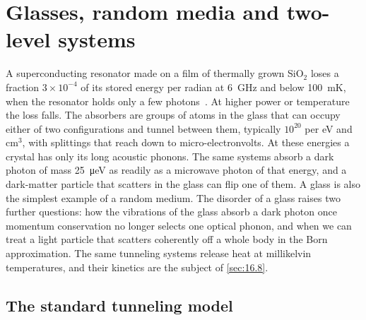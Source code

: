 \section{Glasses, random media and two-level systems}\label{sec:16.7}

A superconducting resonator made on a film of thermally grown SiO$_2$ loses a fraction $3\times10^{-4}$ of its stored energy per radian at \SI{6}{GHz} and below \SI{100}{mK}, when the resonator holds only a few photons~\cite[Table~I]{oconnell2008microwave}. At higher power or temperature the loss falls. The absorbers are groups of atoms in the glass that can occupy either of two configurations and tunnel between them, typically $10^{20}$ per eV and cm$^3$, with splittings that reach down to micro-electronvolts. At these energies a crystal has only its long acoustic phonons. The same systems absorb a dark photon of mass \SI{25}{\micro eV} as readily as a microwave photon of that energy, and a dark-matter particle that scatters in the glass can flip one of them. A glass is also the simplest example of a random medium. The disorder of a glass raises two further questions: how the vibrations of the glass absorb a dark photon once momentum conservation no longer selects one optical phonon, and when we can treat a light particle that scatters coherently off a whole body in the Born approximation. The same tunneling systems release heat at millikelvin temperatures, and their kinetics are the subject of \cref{sec:16.8}.

\subsection{The standard tunneling model}\label{sec:16.7-stm}

